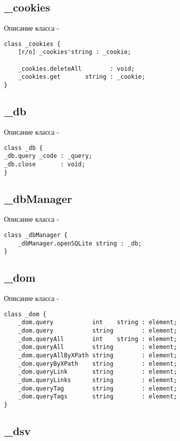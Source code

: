 \subsection{{\color{orange} \_cookies}}

\noindent Описание класса  -
\begin{lstlisting}[numbers=none]
class _cookies {
	[r/o] _cookies'string : _cookie;

	_cookies.deleteAll        : void;
	_cookies.get       string : _cookie;
}
\end{lstlisting}

\subsection{{\color{orange} \_db}}

\noindent Описание класса  -
\begin{lstlisting}[numbers=none]
class _db {
_db.query _code : _query;
_db.close       : void;
}
\end{lstlisting}

\subsection{{\color{orange} \_dbManager}}

\noindent Описание класса  -
\begin{lstlisting}[numbers=none]
class _dbManager {
	_dbManager.openSQLite string : _db;
}
\end{lstlisting}

\subsection{{\color{orange} \_dom}}

\noindent Описание класса  -
\begin{lstlisting}[numbers=none]
class _dom {
	_dom.query           int    string : element;
	_dom.query           string        : element;
	_dom.queryAll        int    string : element;
	_dom.queryAll        string        : element;
	_dom.queryAllByXPath string        : element;
	_dom.queryByXPath    string        : element;
	_dom.queryLink       string        : element;
	_dom.queryLinks      string        : element;
	_dom.queryTag        string        : element;
	_dom.queryTags       string        : element;
}
\end{lstlisting}

\subsection{{\color{orange} \_dsv}}

